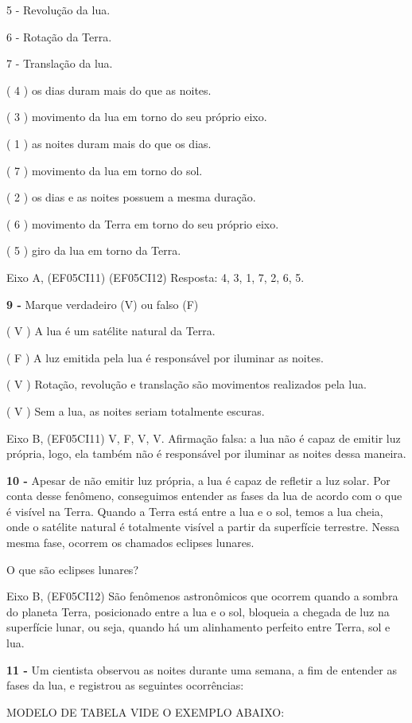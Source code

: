 5 - Revolução da lua.

6 - Rotação da Terra.

7 - Translação da lua.

( 4 ) os dias duram mais do que as noites.

( 3 ) movimento da lua em torno do seu próprio eixo.

( 1 ) as noites duram mais do que os dias.

( 7 ) movimento da lua em torno do sol.

( 2 ) os dias e as noites possuem a mesma duração.

( 6 ) movimento da Terra em torno do seu próprio eixo.

( 5 ) giro da lua em torno da Terra.

Eixo A, (EF05CI11) (EF05CI12) Resposta: 4, 3, 1, 7, 2, 6, 5.

\textbf{9 -} Marque verdadeiro (V) ou falso (F)

( V ) A lua é um satélite natural da Terra.

( F ) A luz emitida pela lua é responsável por iluminar as noites.

( V ) Rotação, revolução e translação são movimentos realizados pela
lua.

( V ) Sem a lua, as noites seriam totalmente escuras.

Eixo B, (EF05CI11) V, F, V, V. Afirmação falsa: a lua não é capaz de
emitir luz própria, logo, ela também não é responsável por iluminar as
noites dessa maneira.

\textbf{10 -} Apesar de não emitir luz própria, a lua é capaz de
refletir a luz solar. Por conta desse fenômeno, conseguimos entender as
fases da lua de acordo com o que é visível na Terra. Quando a Terra está
entre a lua e o sol, temos a lua cheia, onde o satélite natural é
totalmente visível a partir da superfície terrestre. Nessa mesma fase,
ocorrem os chamados eclipses lunares.

O que são eclipses lunares?

Eixo B, (EF05CI12) São fenômenos astronômicos que ocorrem quando a
sombra do planeta Terra, posicionado entre a lua e o sol, bloqueia a
chegada de luz na superfície lunar, ou seja, quando há um alinhamento
perfeito entre Terra, sol e lua.

\textbf{11 -} Um cientista observou as noites durante uma semana, a fim
de entender as fases da lua, e registrou as seguintes ocorrências:

MODELO DE TABELA VIDE O EXEMPLO ABAIXO:

